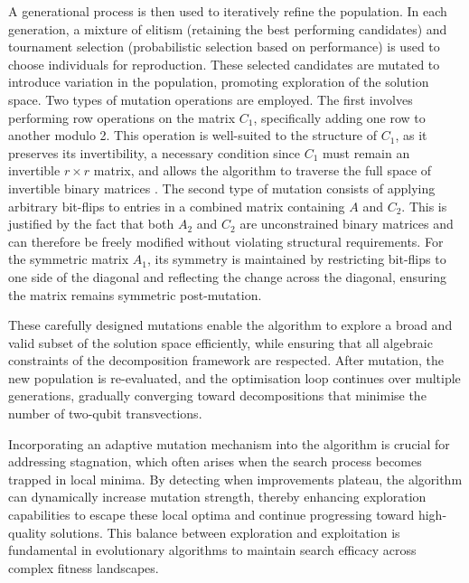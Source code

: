 A generational process is then used to iteratively refine the population. In each generation, a mixture of elitism (retaining the best performing candidates) and tournament selection (probabilistic selection based on performance) is used to choose individuals for reproduction. These selected candidates are mutated to introduce variation in the population, promoting exploration of the solution space. Two types of mutation operations are employed. The first involves performing row operations on the matrix \(C_1\), specifically adding one row to another modulo 2. This operation is well-suited to the structure of \(C_1\), as it preserves its invertibility, a necessary condition since \(C_1\) must remain an invertible \(r\times r\) matrix, and allows the algorithm to traverse the full space of invertible binary matrices \cite{gregor2024generatinginvertiblematricesrow}. The second type of mutation consists of applying arbitrary bit-flips to entries in a combined matrix containing \(A\) and \(C_2\). This is justified by the fact that both \(A_2\) and \(C_2\) are unconstrained binary matrices and can therefore be freely modified without violating structural requirements. For the symmetric matrix \(A_1\), its symmetry is maintained by restricting bit-flips to one side of the diagonal and reflecting the change across the diagonal, ensuring the matrix remains symmetric post-mutation.

These carefully designed mutations enable the algorithm to explore a broad and valid subset of the solution space efficiently, while ensuring that all algebraic constraints of the decomposition framework are respected. After mutation, the new population is re-evaluated, and the optimisation loop continues over multiple generations, gradually converging toward decompositions that minimise the number of two-qubit transvections.

Incorporating an adaptive mutation mechanism into the algorithm is crucial for addressing stagnation, which often arises when the search process becomes trapped in local minima. By detecting when improvements plateau, the algorithm can dynamically increase mutation strength, thereby enhancing exploration capabilities to escape these local optima and continue progressing toward high-quality solutions. This balance between exploration and exploitation is fundamental in evolutionary algorithms to maintain search efficacy across complex fitness landscapes.

